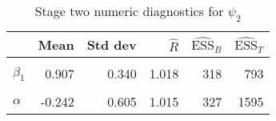 \begin{table}

\caption{\label{tab:surv-stage-two-diag-psi-2}Stage two numeric diagnostics for $\psi_{2}$}
\centering
\begin{tabular}[t]{lrrrrr}
\toprule
  & Mean & Std dev & $\widehat{R}$ & $\widehat{\text{ESS}}_{B}$ & $\widehat{\text{ESS}}_{T}$\\
\midrule
\cellcolor{gray!6}{$\beta_{0}$} & \cellcolor{gray!6}{-0.912} & \cellcolor{gray!6}{0.560} & \cellcolor{gray!6}{1.010} & \cellcolor{gray!6}{640} & \cellcolor{gray!6}{3913}\\
$\beta_{1}$ & 0.907 & 0.340 & 1.018 & 318 & 793\\
\cellcolor{gray!6}{$\gamma$} & \cellcolor{gray!6}{1.401} & \cellcolor{gray!6}{0.311} & \cellcolor{gray!6}{1.013} & \cellcolor{gray!6}{264} & \cellcolor{gray!6}{826}\\
$\alpha$ & -0.242 & 0.605 & 1.015 & 327 & 1595\\
\bottomrule
\end{tabular}
\end{table}